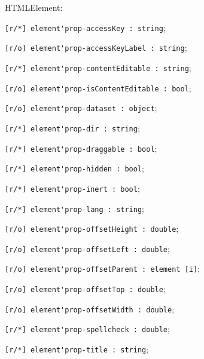 \begin{icItems}
	\item HTMLElement:
	\begin{icItems}
		\item \lstinline|[r/*] element'prop-accessKey : string|;
		\item \lstinline|[r/o] element'prop-accessKeyLabel : string|;
		\item \lstinline|[r/*] element'prop-contentEditable : string|;
		\item \lstinline|[r/o] element'prop-isContentEditable : bool|;
		\item \lstinline|[r/o] element'prop-dataset : object|;
		\item \lstinline|[r/*] element'prop-dir : string|;
		\item \lstinline|[r/*] element'prop-draggable : bool|;
		\item \lstinline|[r/*] element'prop-hidden : bool|;
		\item \lstinline|[r/*] element'prop-inert : bool|;
		\item \lstinline|[r/*] element'prop-lang : string|;
		\item \lstinline|[r/o] element'prop-offsetHeight : double|;
		\item \lstinline|[r/o] element'prop-offsetLeft : double|;
		\item \lstinline|[r/o] element'prop-offsetParent : element [i]|;
		\item \lstinline|[r/o] element'prop-offsetTop : double|;
		\item \lstinline|[r/o] element'prop-offsetWidth : double|;
		\item \lstinline|[r/*] element'prop-spellcheck : double|;
		\item \lstinline|[r/*] element'prop-title : string|;
	\end{icItems}
	

\end{icItems}
